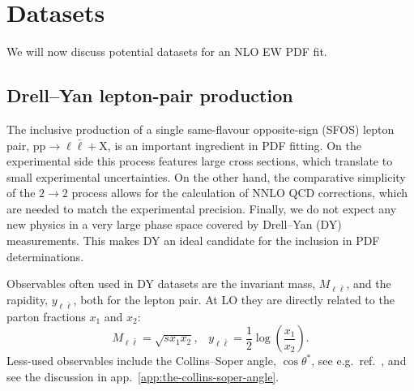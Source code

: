 \section{Datasets}
\label{sec:datasets}

We will now discuss potential datasets for an NLO EW PDF fit.

\subsection{Drell--Yan lepton-pair production}
\label{sec:dy-at-the-lhc}

The inclusive production of a single same-flavour opposite-sign (SFOS) lepton pair, $\mathrm{p}\mathrm{p} \to \ell \bar{\ell} + \mathrm{X}$, is an important ingredient in PDF fitting.
On the experimental side this process features large cross sections, which translate to small experimental uncertainties.
On the other hand, the comparative simplicity of the $2 \to 2$ process allows for the calculation of NNLO QCD corrections, which are needed to match the experimental precision.
Finally, we do not expect any new physics in a very large phase space covered by Drell--Yan (DY) measurements.
This makes DY an ideal candidate for the inclusion in PDF determinations.

Observables often used in DY datasets are the invariant mass, $M_{\ell\bar{\ell}}$, and the rapidity, $y_{\ell\bar{\ell}}$, both for the lepton pair.
At LO they are directly related to the parton fractions $x_1$ and $x_2$:
\begin{equation}
M_{\ell\bar{\ell}} = \sqrt{s x_1 x_2} \text{,} \quad y_{\ell\bar{\ell}} = \frac{1}{2} \log \left( \frac{x_1}{x_2} \right) \text{.}
\end{equation}
Less-used observables include the Collins--Soper angle, $\cos \theta^*$, see e.g.\ ref.~\cite{Aaboud:2017ffb}, and see the discussion in app.~\ref{app:the-collins-soper-angle}.


